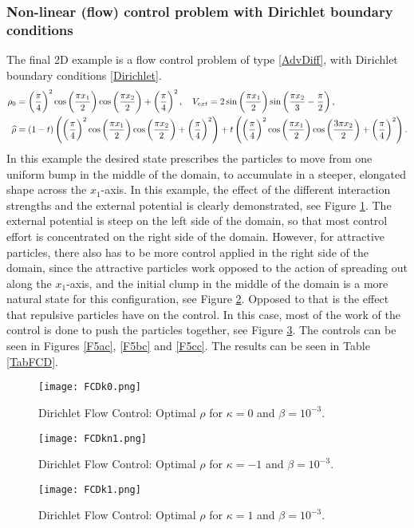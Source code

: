 \subsubsection{Non-linear (flow) control problem with Dirichlet boundary conditions}
The final 2D example is a flow control problem of type \eqref{AdvDiff}, with Dirichlet boundary conditions \eqref{Dirichlet}.
\begin{align*}
	\rho_0 &= \left(\frac{\pi}{4}\right)^2\cos\left(\frac{\pi x_1}{2}\right)\cos\left(\frac{\pi x_2}{2}\right) + \left(\frac{\pi}{4}\right)^2, \quad 
	V_{ext} = 2\sin\left(\frac{\pi x_1}{2}\right) \sin\left(\frac{\pi x_2}{3} - \frac{\pi}{2}\right),\\
	\widehat \rho &= (1 - t)\left(\left(\frac{\pi}{4}\right)^2\cos\left(\frac{\pi x_1}{2}\right)\cos\left(\frac{\pi x_2}{2}\right) + \left(\frac{\pi}{4}\right)^2\right) + t\left(\left(\frac{\pi}{4}\right)^2\cos\left(\frac{\pi x_1}{2}\right)\cos\left(\frac{3\pi x_2}{2}\right) + \left(\frac{\pi}{4}\right)^2\right).
\end{align*}
In this example the desired state prescribes the particles to move from one uniform bump in the middle of the domain, to accumulate in a steeper, elongated shape across the $x_1$-axis. In this example, the effect of the different interaction strengths and the external potential is clearly demonstrated, see Figure \ref{F5a}. The external potential is steep on the left side of the domain, so that most control effort is concentrated on the right side of the domain. However, for attractive particles, there also has to be more control applied in the right side of the domain, since the attractive particles work opposed to the action of spreading out along the $x_1$-axis, and the initial clump in the middle of the domain is a more natural state for this configuration, see Figure \ref{F5b}. Opposed to that is the effect that repulsive particles have on the control. In this case, most of the work of the control is done to push the particles together, see Figure \ref{F5c}. The controls can be seen in Figures \ref{F5ac}, \ref{F5bc} and \ref{F5cc}.
The results can be seen in Table \ref{TabFCD}.




\begin{figure}[h]
	\centering
	\texttt{[image: FCDk0.png]}
	\caption{Dirichlet Flow Control: Optimal $\rho$ for $\kappa = 0$ and $\beta = 10^{-3}$.} 
	\label{F5a}
\end{figure}
\begin{figure}[h]
	\centering
	\texttt{[image: FCDkn1.png]}
	\caption{Dirichlet Flow Control: Optimal $\rho$ for $\kappa = -1$ and $\beta = 10^{-3}$.} 
	\label{F5b}
\end{figure}
\begin{figure}[h]
	\centering
	\texttt{[image: FCDk1.png]}
	\caption{Dirichlet Flow Control: Optimal $\rho$ for $\kappa = 1$ and $\beta = 10^{-3}$.} 
	\label{F5c}
\end{figure}



